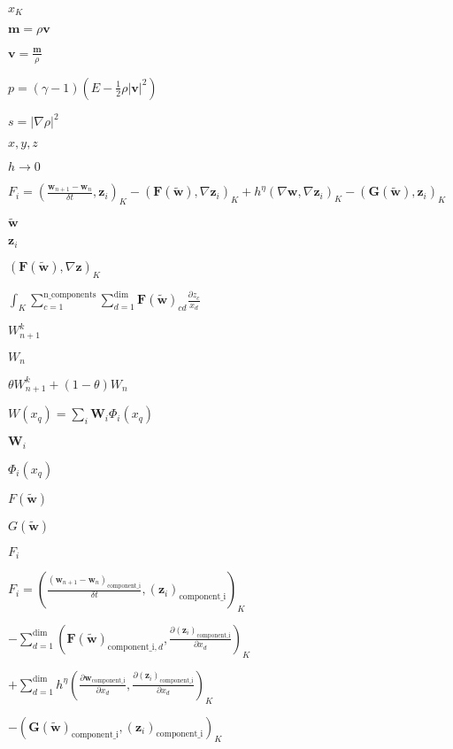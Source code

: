 \documentclass{article}
\begin{document}
$x_K$
\pagebreak

$\mathbf m=\rho\mathbf v$
\pagebreak

$\mathbf v=\frac{\mathbf m}{\rho}$
\pagebreak

$p=(\gamma-1)(E-\frac{1}{2} \rho |\mathbf v|^2)$
\pagebreak

$s=|\nabla \rho|^2$
\pagebreak

$x,y,z$
\pagebreak

$h\rightarrow 0$
\pagebreak

$F_i = \left(\frac{\mathbf{w}_{n+1} - \mathbf{w}_n}{\delta t},\mathbf{z}_i\right)_K - \left(\mathbf{F}(\tilde{\mathbf{w}}), \nabla\mathbf{z}_i\right)_K + h^{\eta}(\nabla \mathbf{w} , \nabla \mathbf{z}_i)_K - (\mathbf{G}(\tilde{\mathbf w}), \mathbf{z}_i)_K$
\pagebreak

$\tilde{\mathbf w}$
\pagebreak

$\mathbf{z}_i$
\pagebreak

$\left(\mathbf{F}(\tilde{\mathbf{w}}), \nabla\mathbf{z}\right)_K$
\pagebreak

$\int_K \sum_{c=1}^{\text{n\_components}} \sum_{d=1}^{\text{dim}} \mathbf{F}(\tilde{\mathbf{w}})_{cd} \frac{\partial z_c}{x_d}$
\pagebreak

$W_{n+1}^k$
\pagebreak

$W_{n}$
\pagebreak

$\theta W_{n+1}^k + (1-\theta)W_n$
\pagebreak

$W(x_q)=\sum_i \mathbf W_i \Phi_i(x_q)$
\pagebreak

$\mathbf W_i$
\pagebreak

$\Phi_i(x_q)$
\pagebreak

$F(\tilde{\mathbf w})$
\pagebreak

$G(\tilde{\mathbf w})$
\pagebreak

$F_i$
\pagebreak

$F_i = \left(\frac{(\mathbf{w}_{n+1} - \mathbf{w}_n)_{\text{component\_i}}}{\delta t},(\mathbf{z}_i)_{\text{component\_i}}\right)_K$
\pagebreak

$- \sum_{d=1}^{\text{dim}} \left(\mathbf{F} (\tilde{\mathbf{w}})_{\text{component\_i},d}, \frac{\partial(\mathbf{z}_i)_{\text{component\_i}}} {\partial x_d}\right)_K$
\pagebreak

$+ \sum_{d=1}^{\text{dim}} h^{\eta} \left(\frac{\partial \mathbf{w}_{\text{component\_i}}}{\partial x_d} , \frac{\partial (\mathbf{z}_i)_{\text{component\_i}}}{\partial x_d} \right)_K$
\pagebreak

$-(\mathbf{G}(\tilde{\mathbf{w}} )_{\text{component\_i}}, (\mathbf{z}_i)_{\text{component\_i}})_K$
\pagebreak
\end{document}
